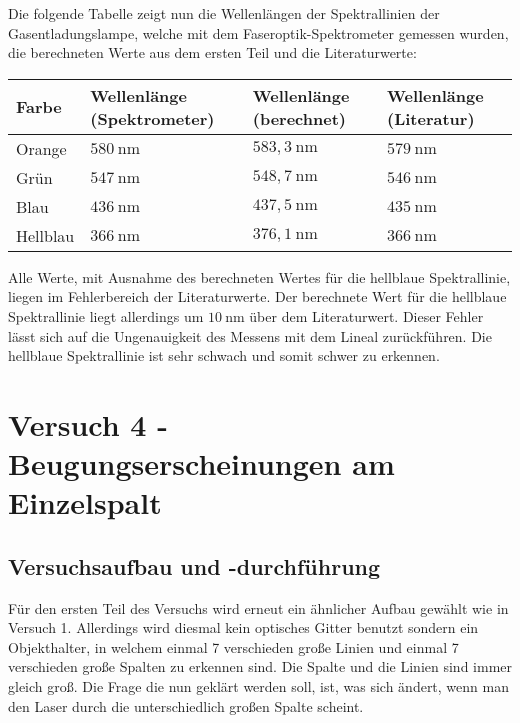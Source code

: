         Die folgende Tabelle zeigt nun die Wellenlängen der Spektrallinien der Gasentladungslampe, welche mit dem Faseroptik-Spektrometer gemessen wurden, die berechneten Werte aus dem ersten Teil und die Literaturwerte:

        \begin{table}[H]
            \centering
            \begin{tabular}{|l|l|l|l|}
                \hline
                Farbe & Wellenlänge (Spektrometer) & Wellenlänge (berechnet) & Wellenlänge (Literatur)\\
                \hline
                Orange & $580\ \mathrm{nm}$ & $583,3\ \mathrm{nm}$ & $579\ \mathrm{nm}$\\
                \hline
                Grün & $547\ \mathrm{nm}$ & $548,7\ \mathrm{nm}$ & $546\ \mathrm{nm}$\\
                \hline
                Blau & $436\ \mathrm{nm}$ & $437,5\ \mathrm{nm}$ & $435\ \mathrm{nm}$\\
                \hline
                Hellblau & $366\ \mathrm{nm}$ & $376,1\ \mathrm{nm}$ & $366\ \mathrm{nm}$\\
                \hline
            \end{tabular}
        \end{table}

        Alle Werte, mit Ausnahme des berechneten Wertes für die hellblaue Spektrallinie, liegen im Fehlerbereich der Literaturwerte. Der berechnete Wert für die hellblaue Spektrallinie liegt allerdings um $10\ \mathrm{nm}$ über dem Literaturwert. Dieser Fehler lässt sich auf die Ungenauigkeit des Messens mit dem Lineal zurückführen. Die hellblaue Spektrallinie ist sehr schwach und somit schwer zu erkennen.

\section{Versuch 4 - Beugungserscheinungen am Einzelspalt}

    \subsection{Versuchsaufbau und -durchführung}

        Für den ersten Teil des Versuchs wird erneut ein ähnlicher Aufbau gewählt wie in Versuch 1. Allerdings wird diesmal kein optisches Gitter benutzt sondern ein Objekthalter, in welchem einmal 7 verschieden große Linien und einmal 7 verschieden große Spalten zu erkennen sind. Die Spalte und die Linien sind immer gleich groß. Die Frage die nun geklärt werden soll, ist, was sich ändert, wenn man den Laser durch die unterschiedlich großen Spalte scheint.


